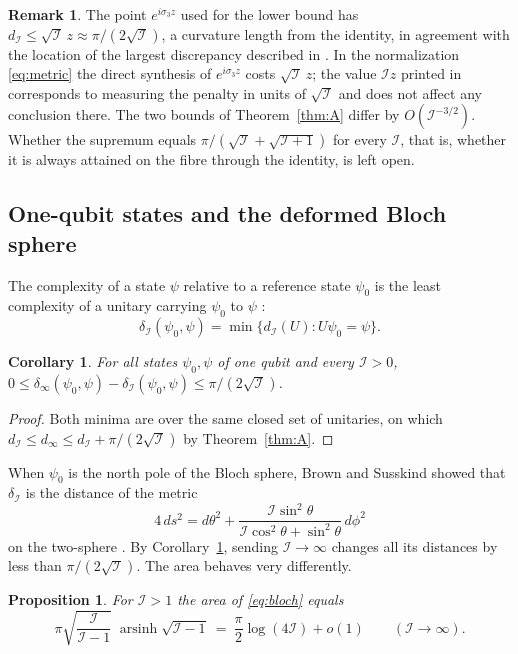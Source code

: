 \documentclass[11pt]{amsart}
\newtheorem{proposition}[theorem]{Proposition}
\newtheorem{corollary}[theorem]{Corollary}
\theoremstyle{definition}
\newtheorem{remark}[theorem]{Remark}
\newcommand{\I}{\mathcal{I}}
\newcommand{\dinf}{d_{\infty}}
\DeclareMathOperator{\arsinh}{arsinh}
\begin{document}
\begin{remark}
The point $e^{i\sigma_3z}$ used for the lower bound has $d_\I\le\sqrt{\I}\,z\approx\pi/(2\sqrt{\I})$, a curvature length from the identity, in agreement with the location of the largest discrepancy described in \cite{BFLS23}. In the normalization \eqref{eq:metric} the direct synthesis of $e^{i\sigma_3z}$ costs $\sqrt{\I}\,z$; the value $\I z$ printed in \cite{BFLS23} corresponds to measuring the penalty in units of $\sqrt{\I}$ and does not affect any conclusion there. The two bounds of Theorem~\ref{thm:A} differ by $O(\I^{-3/2})$. Whether the supremum equals $\pi/(\sqrt{\I}+\sqrt{\I+1})$ for every $\I$, that is, whether it is always attained on the fibre through the identity, is left open.
\end{remark}

\subsection{One-qubit states and the deformed Bloch sphere}

The complexity of a state $\psi$ relative to a reference state $\psi_0$ is the least complexity of a unitary carrying $\psi_0$ to $\psi$ \cite{BS19}:
\[
\delta_\I(\psi_0,\psi)=\min\{d_\I(U):U\psi_0=\psi\}.
\]

\begin{corollary}\label{cor:states}
For all states $\psi_0,\psi$ of one qubit and every $\I>0$, $0\le\delta_\infty(\psi_0,\psi)-\delta_\I(\psi_0,\psi)\le\pi/(2\sqrt{\I})$.
\end{corollary}

\begin{proof}
Both minima are over the same closed set of unitaries, on which $d_\I\le\dinf\le d_\I+\pi/(2\sqrt{\I})$ by Theorem~\ref{thm:A}.
\end{proof}

When $\psi_0$ is the north pole of the Bloch sphere, Brown and Susskind showed that $\delta_\I$ is the distance of the metric
\begin{equation}\label{eq:bloch}
4\,ds^2=d\theta^2+\frac{\I\sin^2\theta}{\I\cos^2\theta+\sin^2\theta}\,d\phi^2
\end{equation}
on the two-sphere \cite[equations~(3.9)--(3.10)]{BS19}. By Corollary~\ref{cor:states}, sending $\I\to\infty$ changes all its distances by less than $\pi/(2\sqrt{\I})$. The area behaves very differently.

\begin{proposition}\label{prop:area}
For $\I>1$ the area of \eqref{eq:bloch} equals
\[
\pi\sqrt{\frac{\I}{\I-1}}\;\arsinh\sqrt{\I-1}\ =\ \frac{\pi}{2}\log(4\I)+o(1)\qquad(\I\to\infty).
\]
\end{proposition}
\end{document}
